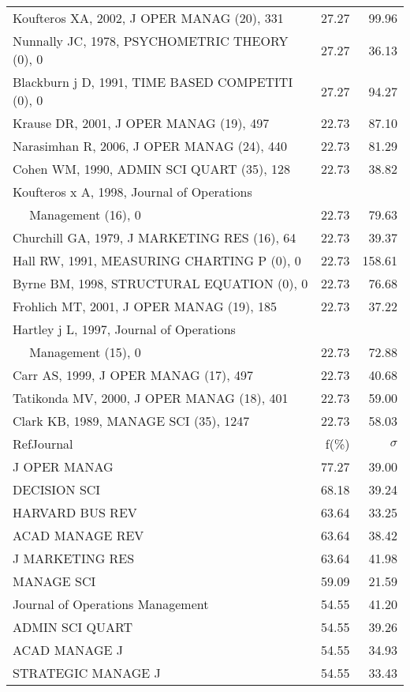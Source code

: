 \documentclass[a4paper,11pt]{report}
\begin{document}
\begin{landscape}
\begin{table}[!ht]
{\begin{tabular}{|l r r|}
Koufteros XA, 2002, J OPER MANAG (20), 331 & 27.27 & 99.96\\
Nunnally JC, 1978, PSYCHOMETRIC THEORY (0), 0 & 27.27 & 36.13\\
Blackburn j D, 1991, TIME BASED COMPETITI (0), 0 & 27.27 & 94.27\\
Krause DR, 2001, J OPER MANAG (19), 497 & 22.73 & 87.10\\
Narasimhan R, 2006, J OPER MANAG (24), 440 & 22.73 & 81.29\\
Cohen WM, 1990, ADMIN SCI QUART (35), 128 & 22.73 & 38.82\\
Koufteros x A, 1998, Journal of Operations &  & \\
$\quad$ Management (16), 0 & 22.73 & 79.63\\
Churchill GA, 1979, J MARKETING RES (16), 64 & 22.73 & 39.37\\
Hall RW, 1991, MEASURING CHARTING P (0), 0 & 22.73 & 158.61\\
Byrne BM, 1998, STRUCTURAL EQUATION (0), 0 & 22.73 & 76.68\\
Frohlich MT, 2001, J OPER MANAG (19), 185 & 22.73 & 37.22\\
Hartley j L, 1997, Journal of Operations &  & \\
$\quad$ Management (15), 0 & 22.73 & 72.88\\
Carr AS, 1999, J OPER MANAG (17), 497 & 22.73 & 40.68\\
Tatikonda MV, 2000, J OPER MANAG (18), 401 & 22.73 & 59.00\\
Clark KB, 1989, MANAGE SCI (35), 1247 & 22.73 & 58.03\\
\hline
\hline
RefJournal & f(\%) & $\sigma$\\
\hline
J OPER MANAG & 77.27 & 39.00\\
DECISION SCI & 68.18 & 39.24\\
HARVARD BUS REV & 63.64 & 33.25\\
ACAD MANAGE REV & 63.64 & 38.42\\
J MARKETING RES & 63.64 & 41.98\\
MANAGE SCI & 59.09 & 21.59\\
Journal of Operations Management & 54.55 & 41.20\\
ADMIN SCI QUART & 54.55 & 39.26\\
ACAD MANAGE J & 54.55 & 34.93\\
STRATEGIC MANAGE J & 54.55 & 33.43\\
\hline
\end{tabular}
}
\end{table}

\end{landscape}
\end{document}
